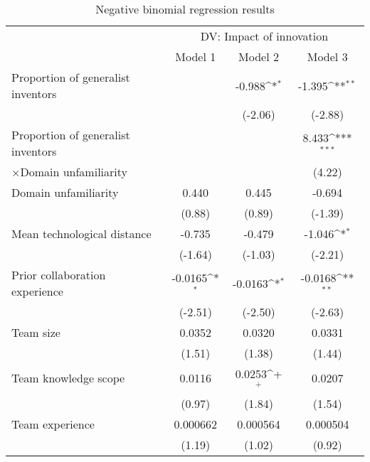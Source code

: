 \begin{table}[htbp]\centering
\def\sym#1{\ifmmode^{#1}\else\(^{#1}\)\fi}
\caption{Negative binomial regression results\label{main}}
\begin{tabular}{l*{3}{c}}
\toprule
&\multicolumn{3}{c}{DV: Impact of innovation}\\
\cmidrule(lr){2-4}
&\multicolumn{1}{c}{Model 1}&\multicolumn{1}{c}{Model 2}&\multicolumn{1}{c}{Model 3}\\
\midrule
Proportion of generalist inventors&                     &      -0.988\sym{*}  &      -1.395\sym{**} \\
                    &                     &     (-2.06)         &     (-2.88)         \\
\addlinespace
Proportion of generalist inventors&                     &                     &       8.433\sym{***}\\
$\times$Domain unfamiliarity     &                     &                     &      (4.22)         \\
\addlinespace
Domain unfamiliarity&       0.440         &       0.445         &      -0.694         \\
&      (0.88)         &      (0.89)         &     (-1.39)         \\
\addlinespace
Mean technological distance&      -0.735         &      -0.479         &      -1.046\sym{*}  \\
&     (-1.64)         &     (-1.03)         &     (-2.21)         \\
\addlinespace
Prior collaboration experience&     -0.0165\sym{*}  &     -0.0163\sym{*}  &     -0.0168\sym{**} \\
                    &     (-2.51)         &     (-2.50)         &     (-2.63)         \\
\addlinespace
Team size           &      0.0352         &      0.0320         &      0.0331         \\
                    &      (1.51)         &      (1.38)         &      (1.44)         \\
\addlinespace
Team knowledge scope&      0.0116         &      0.0253\sym{+}  &      0.0207         \\
                    &      (0.97)         &      (1.84)         &      (1.54)         \\
\addlinespace
Team experience     &    0.000662         &    0.000564         &    0.000504         \\
                    &      (1.19)         &      (1.02)         &      (0.92)         \\

\end{tabular}
\end{table}
